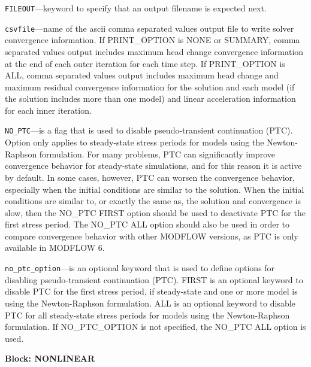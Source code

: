 \begin{description}
\item \texttt{FILEOUT}---keyword to specify that an output filename is expected next.

\item \texttt{csvfile}---name of the ascii comma separated values output file to write solver convergence information. If PRINT\_OPTION is NONE or SUMMARY, comma separated values output includes maximum head change convergence information at the end of each outer iteration for each time step. If PRINT\_OPTION is ALL, comma separated values output includes maximum head change and maximum residual convergence information for the solution and each model (if the solution includes more than one model) and linear acceleration information for each inner iteration.

\item \texttt{NO\_PTC}---is a flag that is used to disable pseudo-transient continuation (PTC). Option only applies to steady-state stress periods for models using the Newton-Raphson formulation. For many problems, PTC can significantly improve convergence behavior for steady-state simulations, and for this reason it is active by default.  In some cases, however, PTC can worsen the convergence behavior, especially when the initial conditions are similar to the solution.  When the initial conditions are similar to, or exactly the same as, the solution and convergence is slow, then the NO\_PTC FIRST option should be used to deactivate PTC for the first stress period.  The NO\_PTC ALL option should also be used in order to compare convergence behavior with other MODFLOW versions, as PTC is only available in MODFLOW 6.

\item \texttt{no\_ptc\_option}---is an optional keyword that is used to define options for disabling pseudo-transient continuation (PTC). FIRST is an optional keyword to disable PTC for the first stress period, if steady-state and one or more model is using the Newton-Raphson formulation. ALL is an optional keyword to disable PTC for all steady-state stress periods for models using the Newton-Raphson formulation. If NO\_PTC\_OPTION is not specified, the NO\_PTC ALL option is used.

\end{description}
\item \textbf{Block: NONLINEAR}

